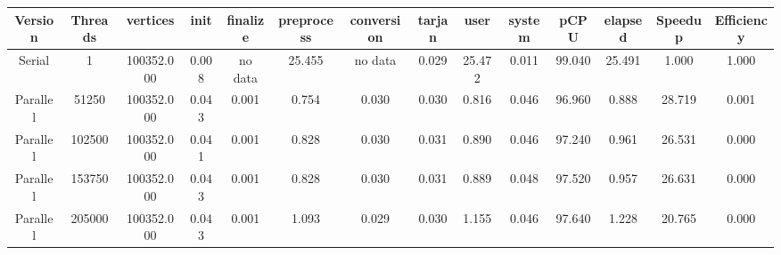 \begin{tabular}{|c|c|c|c|c|c|c|c|c|c|c|c|c|c|}
\toprule
 Version &  Threads &   vertices &  init & finalize &  preprocess & conversion &  tarjan &   user &  system &   pCPU &  elapsed &  Speedup &  Efficiency \\
\midrule
  Serial &        1 & 100352.000 & 0.008 &  no data &      25.455 &    no data &   0.029 & 25.472 &   0.011 & 99.040 &   25.491 &    1.000 &       1.000 \\
Parallel &    51250 & 100352.000 & 0.043 &    0.001 &       0.754 &      0.030 &   0.030 &  0.816 &   0.046 & 96.960 &    0.888 &   28.719 &       0.001 \\
Parallel &   102500 & 100352.000 & 0.041 &    0.001 &       0.828 &      0.030 &   0.031 &  0.890 &   0.046 & 97.240 &    0.961 &   26.531 &       0.000 \\
Parallel &   153750 & 100352.000 & 0.043 &    0.001 &       0.828 &      0.030 &   0.031 &  0.889 &   0.048 & 97.520 &    0.957 &   26.631 &       0.000 \\
Parallel &   205000 & 100352.000 & 0.043 &    0.001 &       1.093 &      0.029 &   0.030 &  1.155 &   0.046 & 97.640 &    1.228 &   20.765 &       0.000 \\
\bottomrule
\end{tabular}
